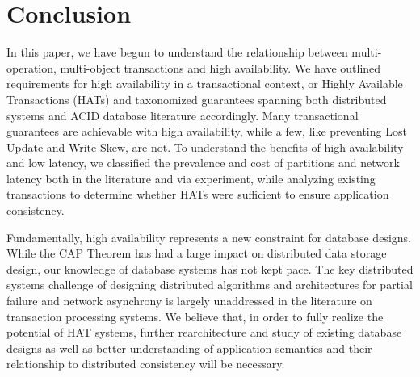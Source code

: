 
\section{Conclusion}

In this paper, we have begun to understand the relationship between
multi-operation, multi-object transactions and high availability. We
have outlined requirements for high availability in a transactional
context, or Highly Available Transactions (HATs) and taxonomized
guarantees spanning both distributed systems and ACID database
literature accordingly. Many transactional guarantees are achievable
with high availability, while a few, like preventing Lost Update and
Write Skew, are not. To understand the benefits of high availability
and low latency, we classified the prevalence and cost of partitions
and network latency both in the literature and via experiment, while
analyzing existing transactions to determine whether HATs were
sufficient to ensure application consistency.

Fundamentally, high availability represents a new constraint for
database designs. While the CAP Theorem has had a large impact on
distributed data storage design, our knowledge of database systems has
not kept pace. The key distributed systems challenge of designing
distributed algorithms and architectures for partial failure and
network asynchrony is largely unaddressed in the literature on
transaction processing systems. We believe that, in order to fully
realize the potential of HAT systems, further rearchitecture and study
of existing database designs as well as better understanding of
application semantics and their relationship to distributed
consistency will be necessary.
